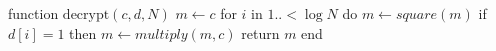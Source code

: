 \documentclass[margin={0 0 39mm 0}]{standalone}
\begin{document}
\begin{Pseudocode}[frame=single]
function $\text{decrypt}(c, d, N)$
  $m \gets c$
  for $i$ in $1 ..{<} \log N$ do
    $m \gets square(m)$
    if $d[i] = 1$ then
      $m \gets multiply(m, c)$
  return $m$
end
\end{Pseudocode}
\end{document}
